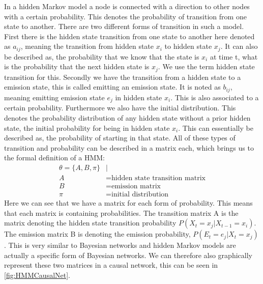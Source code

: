 In a hidden Markov model a node is connected with a direction to other nodes with a certain probability. This denotes the probability of transition from one state to another. There are two different forms of transition in such a model.
First there is the hidden state transition from one state to another here denoted as $a_{ij}$, meaning the transition from hidden state $x_i$ to hidden state $x_j$. It can also be described as, the probability that we know that the state is $x_i$ at time t, what is the probability that the next hidden state is $x_j$. We use the term hidden state transition for this.
Secondly we have the transition from a hidden state to a emission state, this is called emitting an emission state. It is noted as $b_{ij}$, meaning emitting emission state $e_j$ in hidden state $x_i$. This is also associated to a certain probability.
Furthermore we also have the initial distribution. This denotes the probability distribution of any hidden state without a prior hidden state, the initial probability for being in hidden state $x_i$. This can essentially be described as, the probability of starting in that state.
All of these types of transition and probability can be described in a matrix each, which brings us to the formal definition of a HMM:
\begin{align*}
\theta = \{A,B,\pi\} &|\\
A &= \text{hidden state transition matrix}\\
B &= \text{emission matrix}\\
\pi &= \text{initial distribution}
\end{align*}
Here we can see that we have a matrix for each form of probability. This means that each matrix is containing probabilities. The transition matrix A is the matrix denoting the hidden state transition probability $P(X_t=x_j|X_{t-1}=x_i)$. The emission matrix B is denoting the emission probability, $P(E_t=e_j|X_t=x_j)$. This is very similar to Bayesian networks and hidden Markov models are actually a specific form of Bayesian networks. We can therefore also graphically represent these two matrices in a causal network, this can be seen in \cref{fig:HMMCausalNet}.

